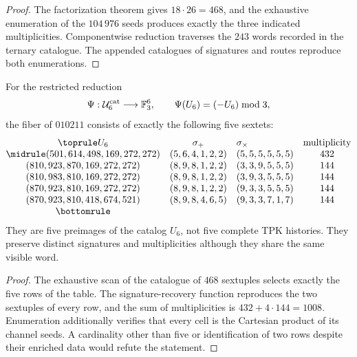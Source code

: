 \begin{proof}
The factorization theorem gives \(18\cdot26=468\), and the exhaustive enumeration
of the \(104\,976\) seeds produces exactly the three
indicated multiplicities. Componentwise reduction traverses the
\(243\) words recorded in the ternary catalogue. The appended catalogues of
signatures and routes reproduce both enumerations.
\end{proof}

\begin{proposition}
\label{pf84:E02-22}
For the restricted reduction
\[
 \Psi:\mathcal U_6^{\rm cat}\longrightarrow\mathbb F_3^6,
 \qquad \Psi(U_6)=(-U_6)\bmod3,
\]
the fiber of \(010211\) consists of exactly the following five sextets:
\begingroup
\scriptsize
\[
\begin{array}{@{}cclc@{}}
\toprule
U_6&\sigma_+&\sigma_\times&\text{multiplicity}\\
\midrule
(501,614,498,169,272,272)&(5,6,4,1,2,2)&(5,5,5,5,5,5)&432\\
(810,923,870,169,272,272)&(8,9,8,1,2,2)&(3,3,9,5,5,5)&144\\
(810,983,810,169,272,272)&(8,9,8,1,2,2)&(3,9,3,5,5,5)&144\\
(870,923,810,169,272,272)&(8,9,8,1,2,2)&(9,3,3,5,5,5)&144\\
(870,923,810,418,674,521)&(8,9,8,4,6,5)&(9,3,3,7,1,7)&144\\
\bottomrule
\end{array}
\]
\endgroup
They are five preimages of the catalog \(U_6\), not five complete TPK
histories. They preserve distinct signatures and multiplicities although they share the same
visible word.
\end{proposition}

\begin{proof}
The exhaustive scan of the catalogue of \(468\) sextuples selects exactly
the five rows of the table. The signature-recovery function reproduces
the two sextuples of every row, and the sum of multiplicities is
\(432+4\cdot144=1008\). Enumeration additionally verifies that every cell is the
Cartesian product of its channel seeds. A cardinality other than five
or identification of two rows despite their enriched data would refute the
statement.
\end{proof}
